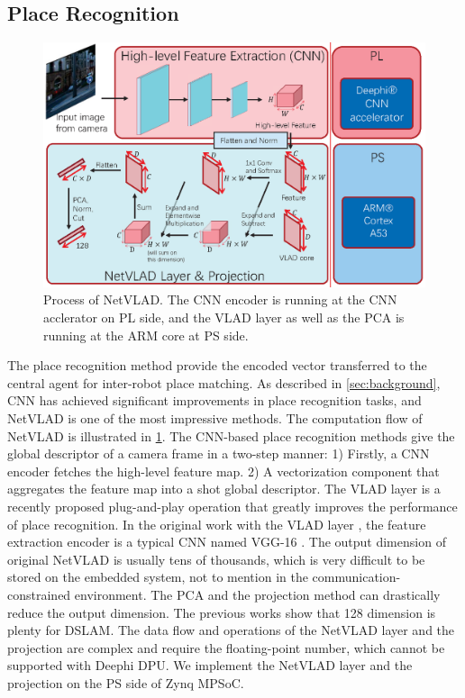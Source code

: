 
\subsection{Place Recognition}

\begin{figure}[t]
    \centering  
    \includegraphics[width=0.95\linewidth]{fig/NetVLAD.eps}
    \caption{Process of NetVLAD. The CNN encoder is running at the CNN acclerator on PL side, and the VLAD layer as well as the PCA is running at the ARM core at PS side.}
    \label{fig:NetVLAD}
\end{figure}

The place recognition method provide the encoded vector transferred to the central agent for inter-robot place matching. As described in \cref{sec:background}, CNN has achieved significant improvements in place recognition tasks, and NetVLAD \cite{Arandjelovic:2017997} is one of the most impressive methods. The computation flow of NetVLAD is illustrated in \cref{fig:NetVLAD}. The CNN-based place recognition methods give the global descriptor of a camera frame in a two-step manner: 1) Firstly, a CNN encoder fetches the high-level feature map. 2) A vectorization component that aggregates the feature map into a shot global descriptor. The VLAD layer \cite{Arandjelovic:2017997} is a recently proposed plug-and-play operation that greatly improves the performance of place recognition. In the original work with the VLAD layer \cite{Arandjelovic:2017997}, the feature extraction encoder is a typical CNN named VGG-16 \cite{Simonyan:20143be}. The output dimension of original NetVLAD is usually tens of thousands, which is very difficult to be stored on the embedded system, not to mention in the communication-constrained environment. The PCA and the projection method can drastically reduce the output dimension. The previous works\cite{Cieslewski:20187ee} show that 128 dimension is plenty for DSLAM. The data flow and operations of the NetVLAD layer and the projection are complex and require the floating-point number, which cannot be supported with Deephi DPU. We implement the NetVLAD layer and the projection on the PS side of Zynq MPSoC.


